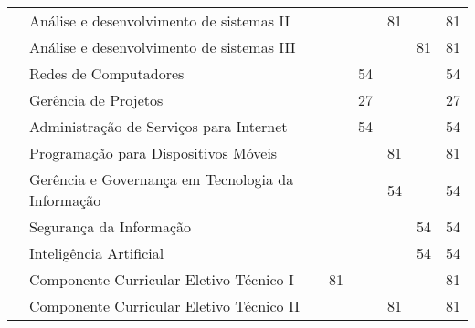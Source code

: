\documentclass[11pt,fleqn]{book} %
\begin{document}
\begin{table}[]
{\begin{tabular}{|l|l|c|c|c|c|c|c|}
				& Análise e desenvolvimento de sistemas II      &                      &                      &                      & 81                   &                      & 81            \\ \cline{2-8} 
				& Análise e desenvolvimento de sistemas III     &                      &                      &                      &                      & 81                   & 81            \\ \cline{2-8} 
				& Redes de Computadores                         &                      &                      & 54                   &                      &                      & 54            \\ \cline{2-8} 
				& Gerência de Projetos                          &                      &                      & 27                   &                      &                      & 27            \\ \cline{2-8} 
				& Administração de Serviços para Internet       &                      &                      & 54                   &                      &                      & 54            \\ \cline{2-8} 
				& Programação para Dispositivos Móveis          &                      &                      &                      & 81                   &                      & 81            \\ \cline{2-8} 
				& Gerência e Governança em Tecnologia da Informação                    &                      &                      &                      & 54                   &                      & 54            \\ \cline{2-8} 
				& Segurança da Informação                       &                      &                      &                      &                      & 54                   & 54            \\ \cline{2-8} 
				& Inteligência Artificial        &                      &                      &                      &                      & 54                   & 54            \\ \cline{2-8} 
				& Componente Curricular Eletivo Técnico I       &                      & 81                   &                      &                      &                      & 81            \\ \cline{2-8} 
				& Componente Curricular Eletivo Técnico II      &                      &                      &                      & 81                   &                      & 81            \\ \cline{2-8} 

\end{tabular}}
\end{table}
\end{document}
